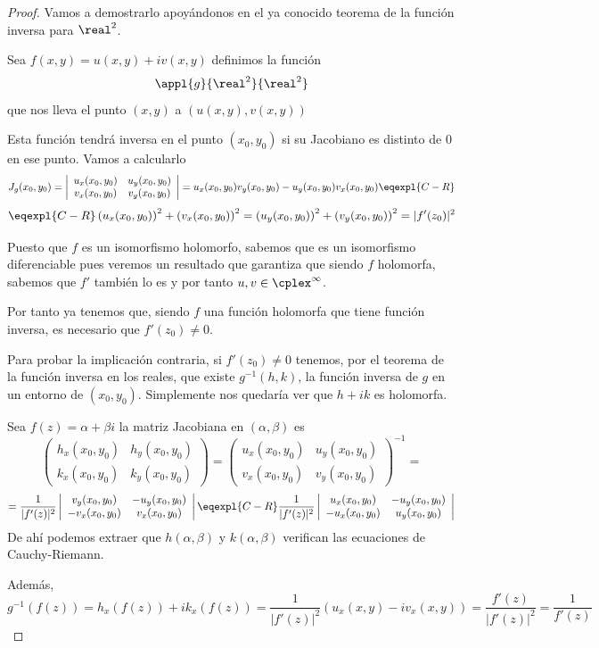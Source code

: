 \documentclass{apuntes}
\begin{document}
\begin{proof}
Vamos a demostrarlo apoyándonos en el ya conocido teorema de la función inversa para $\real^2$.

Sea $f(x,y)=u(x,y)+iv(x,y)$ definimos la función
\[\appl{g}{\real^2}{\real^2}\]
que nos lleva el punto $(x,y)$ a $\left( u(x,y), v(x,y)\right)$

Esta función tendrá inversa en el punto $(x_0,y_0)$ si su Jacobiano es distinto de 0 en ese punto. Vamos a calcularlo
\[ J_g(x_0,y_0) = \left| \begin{array}{cc}
u_x(x_0,y_0) & u_y(x_0,y_0)\\
v_x(x_0,y_0) & v_y(x_0,y_0) \end{array} \right| = u_x(x_0,y_0)v_y(x_0,y_0)-u_y(x_0,y_0)v_x(x_0,y_0) \eqexpl{C-R}\]
\[\eqexpl{C-R} \left(u_x(x_0,y_0)\right)^2 +\left(v_x(x_0,y_0)\right)^2 = \left(u_y(x_0,y_0)\right)^2 +\left(v_y(x_0,y_0)\right)^2 = |f'(z_0)|^2\]

Puesto que $f$ es un isomorfismo holomorfo, sabemos que es un isomorfismo diferenciable pues veremos un resultado que garantiza que siendo $f$ holomorfa, sabemos que $f'$ también lo es y por tanto $u,v \in \cplex^{\infty}$.

Por tanto ya tenemos que, siendo $f$ una función holomorfa que tiene función inversa, es necesario que $f'(z_0)\neq 0$.

Para probar la implicación contraria, si $f'(z_0) \neq 0$ tenemos, por el teorema de la función inversa en los reales, que existe $g^{-1}(h,k)$, la función inversa de $g$ en un entorno de $(x_0,y_0)$. Simplemente nos quedaría ver que $h+ik$ es holomorfa.

Sea $f(z)=α+βi$ la matriz Jacobiana en $(α,β)$ es
\[\left( \begin{array}{cc}
h_x(x_0,y_0) & h_y(x_0,y_0)\\
k_x(x_0,y_0) & k_y(x_0,y_0) \end{array} \right) = \left( \begin{array}{cc}
u_x(x_0,y_0) & u_y(x_0,y_0)\\
v_x(x_0,y_0) & v_y(x_0,y_0) \end{array} \right)^{-1}=\]
\[=\frac{1}{|f'(z)|^2}\left| \begin{array}{cc}
v_y(x_0,y_0) & -u_y(x_0,y_0)\\
-v_x(x_0,y_0) & v_x(x_0,y_0) \end{array} \right| \eqexpl{C-R} \frac{1}{|f'(z)|^2}\left| \begin{array}{cc}
u_x(x_0,y_0) & -u_y(x_0,y_0)\\
-u_x(x_0,y_0) & u_y(x_0,y_0) \end{array} \right| \]
De ahí podemos extraer que $h(α,β)$ y $k(α,β)$ verifican las ecuaciones de Cauchy-Riemann.

Además,
\[g^{-1}(f(z))=h_x(f(z))+ik_x(f(z)) = \frac{1}{|f'(z)|^2}\left( u_x(x,y)-iv_x(x,y)\right) = \frac{f'(z)}{|f'(z)|^2} = \frac{1}{f'(z)}\]

\end{proof}
\end{document}
